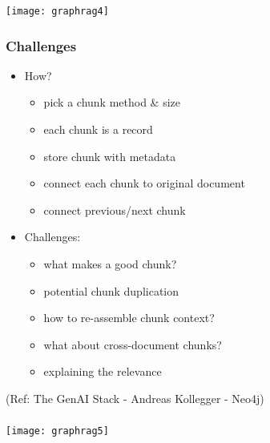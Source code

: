 \begin{frame}[fragile]\frametitle{}

	\begin{center}
	\texttt{[image: graphrag4]}
	\end{center}
	
\end{frame}

\begin{frame}[fragile]\frametitle{Challenges}
    \begin{itemize}
        \item How?
		    \begin{itemize}
				\item pick a chunk method \& size
				\item each chunk is a record
				\item store chunk with metadata
				\item connect each chunk to original document
				\item connect previous/next chunk
		    \end{itemize}
        \item Challenges:
		    \begin{itemize}
				\item what makes a good chunk?
				\item potential chunk duplication
				\item how to re-assemble chunk context?
				\item  what about cross-document chunks?
				\item explaining the relevance
		    \end{itemize}
    \end{itemize}
	
	{\tiny (Ref: The GenAI Stack - Andreas Kollegger - Neo4j)}
	
\end{frame}

\begin{frame}[fragile]\frametitle{}

	\begin{center}
	\texttt{[image: graphrag5]}
	\end{center}
	
\end{frame}

